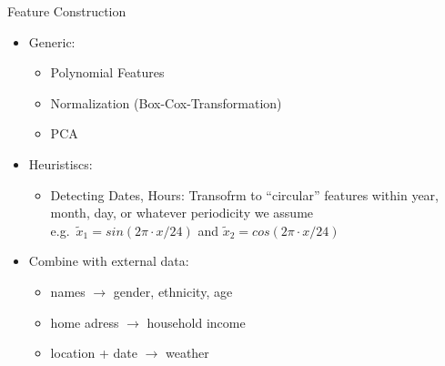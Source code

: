 \begin{frame}{Feature Construction}
  \begin{itemize}
    \item Generic:
    \begin{itemize}
      \item Polynomial Features
      \item Normalization (Box-Cox-Transformation)
      \item PCA
    \end{itemize}
    \item Heuristiscs:
    \begin{itemize}
      \item Detecting Dates, Hours: Transofrm to ``circular'' features within year, month, day, or whatever periodicity we assume \\
      e.g.\ $\tilde x_1 = sin(2\pi \cdot x /24)$ and $\tilde x_2 = cos(2\pi \cdot x /24)$
    \end{itemize}
    \item Combine with external data:
    \begin{itemize}
      \item names $\rightarrow$ gender, ethnicity, age
      \item home adress $\rightarrow$ household income
      \item location + date $\rightarrow$ weather
    \end{itemize}
  \end{itemize}
    
\end{frame}

